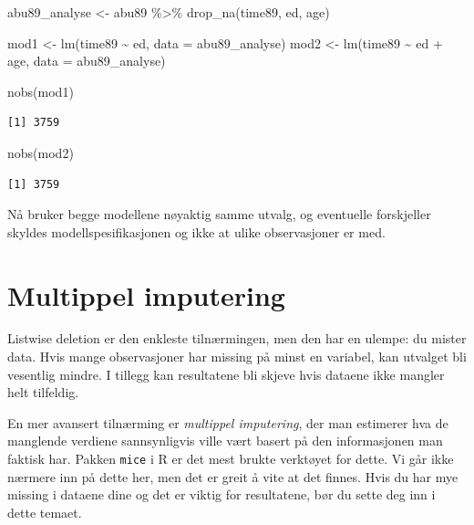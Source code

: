 \documentclass[
  norsk,
  letterpaper,
  DIV=11,
  numbers=noendperiod]{scrreprt}
\newenvironment{Shaded}{\begin{snugshade}}{\end{snugshade}}
\newcommand{\AttributeTok}[1]{\textcolor[rgb]{0.40,0.45,0.13}{#1}}
\newcommand{\FunctionTok}[1]{\textcolor[rgb]{0.28,0.35,0.67}{#1}}
\newcommand{\NormalTok}[1]{\textcolor[rgb]{0.00,0.23,0.31}{#1}}
\newcommand{\OtherTok}[1]{\textcolor[rgb]{0.00,0.23,0.31}{#1}}
\newcommand{\SpecialCharTok}[1]{\textcolor[rgb]{0.37,0.37,0.37}{#1}}
\theoremstyle{definition}
\theoremstyle{remark}
\begin{document}
\begin{Shaded}
\begin{Highlighting}[]
\NormalTok{abu89\_analyse }\OtherTok{\textless{}{-}}\NormalTok{ abu89 }\SpecialCharTok{\%\textgreater{}\%}
  \FunctionTok{drop\_na}\NormalTok{(time89, ed, age)}

\NormalTok{mod1 }\OtherTok{\textless{}{-}} \FunctionTok{lm}\NormalTok{(time89 }\SpecialCharTok{\textasciitilde{}}\NormalTok{ ed, }\AttributeTok{data =}\NormalTok{ abu89\_analyse)}
\NormalTok{mod2 }\OtherTok{\textless{}{-}} \FunctionTok{lm}\NormalTok{(time89 }\SpecialCharTok{\textasciitilde{}}\NormalTok{ ed }\SpecialCharTok{+}\NormalTok{ age, }\AttributeTok{data =}\NormalTok{ abu89\_analyse)}

\FunctionTok{nobs}\NormalTok{(mod1)}
\end{Highlighting}
\end{Shaded}

\begin{verbatim}
[1] 3759
\end{verbatim}

\begin{Shaded}
\begin{Highlighting}[]
\FunctionTok{nobs}\NormalTok{(mod2)}
\end{Highlighting}
\end{Shaded}

\begin{verbatim}
[1] 3759
\end{verbatim}

Nå bruker begge modellene nøyaktig samme utvalg, og eventuelle
forskjeller skyldes modellspesifikasjonen og ikke at ulike observasjoner
er med.

\section{Multippel imputering}\label{multippel-imputering}

Listwise deletion er den enkleste tilnærmingen, men den har en ulempe:
du mister data. Hvis mange observasjoner har missing på minst en
variabel, kan utvalget bli vesentlig mindre. I tillegg kan resultatene
bli skjeve hvis dataene ikke mangler helt tilfeldig.

En mer avansert tilnærming er \emph{multippel imputering}, der man
estimerer hva de manglende verdiene sannsynligvis ville vært basert på
den informasjonen man faktisk har. Pakken \texttt{mice} i R er det mest
brukte verktøyet for dette. Vi går ikke nærmere inn på dette her, men
det er greit å vite at det finnes. Hvis du har mye missing i dataene
dine og det er viktig for resultatene, bør du sette deg inn i dette
temaet.
\end{document}

